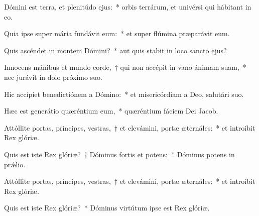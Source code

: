\item Dómini est terra, et plenitúdo ejus:~* orbis terrárum, et univérsi qui hábitant in eo.

\item Quia ipse super mária fundávit eum:~* et super flúmina præparávit eum.

\item Quis ascéndet in montem Dómini?~* aut quis stabit in loco sancto ejus?

\item Innocens mánibus et mundo corde,~† qui non accépit in vano ánimam suam,~* nec jurávit in dolo próximo suo.

\item Hic accípiet benedictiónem a Dómino:~* et misericórdiam a Deo, salutári suo.

\item Hæc est generátio quæréntium eum,~* quæréntium fáciem Dei Jacob.

\item Attóllite portas, príncipes, vestras,~† et elevámini, portæ æternáles:~* et introíbit Rex glóriæ.

\item Quis est iste Rex glóriæ?~† Dóminus fortis et potens:~* Dóminus potens in prǽlio.

\item Attóllite portas, príncipes, vestras,~† et elevámini, portæ æternáles:~* et introíbit Rex glóriæ.

\item Quis est iste Rex glóriæ?~* Dóminus virtútum ipse est Rex glóriæ.


